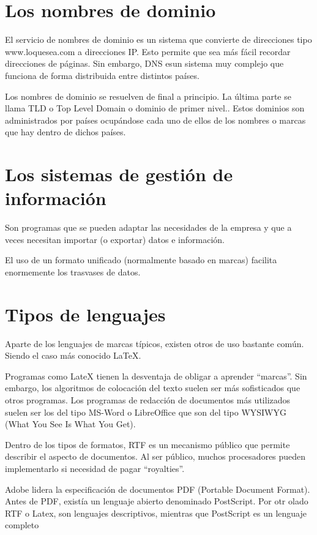 \documentclass[letterpaper,10pt,spanish]{sphinxmanual}
\begin{document}
\section{Los nombres de dominio}
\label{tema1:los-nombres-de-dominio}
El servicio de nombres de dominio es un sistema que convierte de direcciones tipo www.loquesea.com a direcciones IP. Esto permite que sea más fácil recordar direcciones de páginas. Sin embargo, DNS esun sistema muy complejo que funciona de forma distribuida entre distintos países.

Los nombres de dominio se resuelven de final a principio. La última parte se llama TLD o Top Level Domain o dominio de primer nivel.. Estos dominios son administrados por países ocupándose cada uno de ellos de los nombres o marcas que hay dentro de dichos países.


\section{Los sistemas de gestión de información}
\label{tema1:los-sistemas-de-gestion-de-informacion}
Son programas que se pueden adaptar las necesidades de la empresa y que a veces necesitan
importar (o exportar) datos e información.

El uso de un formato unificado (normalmente basado en marcas) facilita enormemente los
trasvases de datos.


\section{Tipos de lenguajes}
\label{tema1:tipos-de-lenguajes}
Aparte de los lenguajes de marcas típicos, existen otros de uso bastante común. Siendo el caso más conocido LaTeX.

Programas como LateX tienen la desventaja de obligar a aprender “marcas”. Sin embargo, los algoritmos de colocación del texto suelen ser más sofisticados que otros programas. Los programas de redacción de documentos más utilizados suelen ser los del tipo MS-Word o LibreOffice que son del tipo WYSIWYG (What You See Is What You Get).

Dentro de los tipos de formatos, RTF es un mecanismo público que permite describir el aspecto de documentos. Al ser público, muchos procesadores pueden implementarlo si necesidad de pagar “royalties”.

Adobe lidera la especificación de documentos PDF (Portable Document Format). Antes de
PDF, existía un lenguaje abierto denominado PostScript. Por otr olado RTF o Latex, son lenguajes descriptivos, mientras que PostScript es un lenguaje completo
\end{document}
